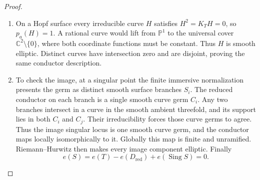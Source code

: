 \begin{proof}
\begin{enumerate}[label={$\langle1\rangle$\arabic*.},leftmargin=*]
\item On a Hopf surface every irreducible curve $H$ satisfies
$H^2=K_TH=0$, so $p_a(H)=1$. A rational curve would lift from
$\mathbb P^1$ to the universal cover $\mathbb C^2\setminus\{0\}$,
where both coordinate functions must be constant. Thus $H$
is smooth elliptic. Distinct curves have intersection zero and
are disjoint, proving the same conductor description.

\item To check the image, at a singular point the finite immersive
normalization presents the germ as distinct smooth surface
branches $S_i$. The reduced conductor on each branch is a single
smooth curve germ $C_i$. Any two branches intersect in a curve
in the smooth ambient threefold, and its support lies in both
$C_i$ and $C_j$. Their irreducibility forces those curve germs
to agree. Thus the image singular locus is one smooth curve
germ, and the conductor maps locally isomorphically to it.
Globally this map is finite and unramified. Riemann--Hurwitz
then makes every image component elliptic. Finally
\[
 e(S)=e(T)-e(D_{\mathrm{red}})+e(\operatorname{Sing}S)=0.
\]

\end{enumerate}
\end{proof}
